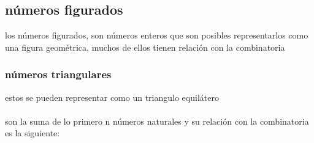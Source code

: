 \subsection{números figurados}
los números figurados, son números enteros  que son posibles representarlos como una figura geométrica, muchos de ellos tienen relación con la combinatoria
\subsubsection{números triangulares}
estos se pueden representar como un triangulo equilátero
\\
\\son la suma de lo primero n números naturales y su relación con la combinatoria es la siguiente:
